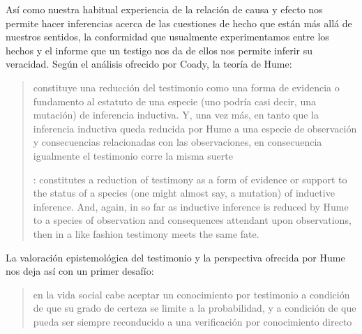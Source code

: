 Así como nuestra habitual experiencia de la relación de causa y efecto nos permite hacer inferencias acerca de las cuestiones de hecho que están más allá de nuestros sentidos, la conformidad que usualmente experimentamos entre los hechos y el informe que un testigo nos da de ellos nos permite inferir su veracidad. Según el análisis ofrecido por Coady, la teoría de Hume: \blockquote[{\cite[79]{coady1992test}}: constitutes a reduction of testimony as a form of evidence or support to the status of a species (one might almost say, a mutation) of inductive inference. And, again, in so far as inductive inference is reduced by Hume to a species of observation and consequences attendant upon observations, then in a like fashion testimony meets the same fate.]{constituye una reducción del testimonio como una forma de evidencia o fundamento al estatuto de una especie (uno podría casi decir, una mutación) de inferencia inductiva. Y, una vez más, en tanto que la inferencia inductiva queda reducida por Hume a una especie de observación y consecuencias relacionadas con las observaciones, en consecuencia igualmente el testimonio corre la misma suerte} La valoración epistemológica del testimonio y la perspectiva ofrecida por Hume nos deja así con un primer desafío: \blockquote[{\cite[294]{prades2015testimonio}}]{en la vida social cabe aceptar un conocimiento por testimonio a condición de que su grado de certeza se limite a la probabilidad, y a condición de que pueda ser siempre reconducido a una verificación por conocimiento directo}.

